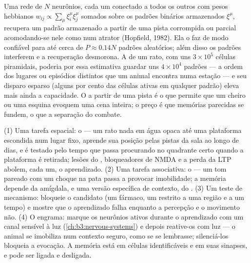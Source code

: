 \begin{proposition}\label{prop:b3:learning-memory:capacity}
Uma rede de $N$ neurônios, cada um conectado a todos os outros com pesos
hebbianos $w_{ij} \propto \sum_{\mu}\xi_{i}^{\mu}\xi_{j}^{\mu}$ somados
sobre os padrões binários armazenados $\xi^{\mu}$, recupera um padrão
armazenado a partir de uma pista corrompida ou parcial acomodando-se
nele como num atrator (Hopfield, 1982). Ela o faz de modo confiável para
até cerca de $P
\approx 0.14N$ padrões aleatórios; além disso os padrões
interferem e a recuperação desmorona. A  de um rato, com uns
$3\times 10^{5}$ células piramidais, poderia por essa estimativa guardar
uns $4\times 10^{4}$ padrões --- a ordem dos lugares ou episódios
distintos que um animal encontra numa estação --- e seu disparo esparso
(alguns por cento das células ativas em qualquer padrão) eleva mais
ainda a capacidade. O  a partir de uma pista é o
que permite que um cheiro ou uma esquina evoquem uma cena inteira; o
preço é que memórias parecidas se fundem, o que a separação do  combate.
\end{proposition}
\admitted

\begin{method}\label{met:b3:learning-memory:tests}
(1) Uma tarefa espacial: o  --- um rato nada
em água opaca até uma plataforma escondida num lugar fixo, aprende sua
posição pelas pistas da sala ao longo de dias, e é testado pelo tempo
que passa procurando no quadrante certo quando a plataforma é retirada;
lesões do , bloqueadores de NMDA e a perda da LTP abolem, cada
um, o aprendizado. (2) Uma tarefa associativa: o 
--- um tom pareado com um choque na pata passa a provocar imobilidade; a
memória depende da amígdala, e uma versão específica de contexto, do
. (3) Um teste de mecanismo: bloqueie o candidato (um fármaco,
um  restrito a uma região e a um tempo) e mostre que o
aprendizado falha enquanto a percepção e o movimento não. (4) O
engrama: marque os neurônios ativos durante o aprendizado com um canal
sensível à luz (\cref{ch:b3:nervous-systems}) e depois reative-os com
luz --- o animal se imobiliza num contexto seguro, como se se lembrasse;
silenciá-los bloqueia a evocação. A memória está em células
identificáveis e em suas sinapses, e pode ser ligada e desligada.
\end{method}

